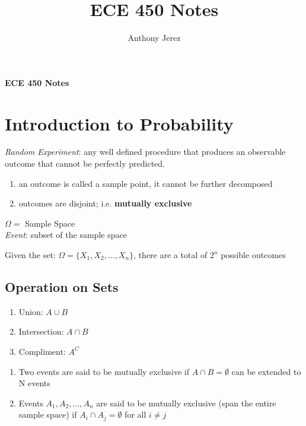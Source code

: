 \documentclass[12pt]{article}
\title{ECE 450 Notes}
\author{Anthony Jerez}
\begin{document}
    \begin{center}
        \textbf{ECE 450 Notes}
    \end{center}

    \section{Introduction to Probability}

    \textit{Random Experiment}: any well defined procedure that 
    produces an observable outcome that cannot be perfectly predicted.
    
    \begin{enumerate}[label=(\alph*)]
        \item an outcome is called a sample point, 
        it cannot be further decomposed
        \item outcomes are disjoint; i.e. \textbf{mutually exclusive}
    \end{enumerate}
    
    \begin{center}
        $\Omega =$ Sample Space\\
        \textit{Event}: subset of the sample space
    \end{center}
    Given the set: $\Omega = \{X_1, X_2, ... , X_n\}$, 
    there are a total of $ 2^n $ possible outcomes

    \subsection{Operation on Sets}

    \begin{enumerate}
        \item Union: $A \cup B$
        \item Intersection: $A \cap B$
        \item Compliment: $A^C$
    \end{enumerate}

    \begin{enumerate}[label=(\alph*)]
        \item Two events are said to be mutually exclusive if 
        $ A \cap B = \emptyset $ can be extended to N events
        \item Events $A_1, A_2, ... , A_n$ are said to be mutually 
        exclusive (span the entire sample space) if $ A_i \cap A_j = \emptyset $ 
        for all $ i \neq j $
    \end{enumerate}
\end{document}
